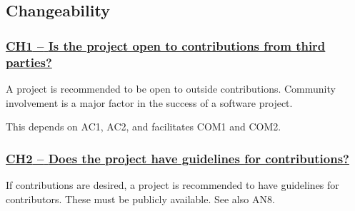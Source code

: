 \documentclass[a4paper,11pt]{article}
\newcommand{\indicator}[1]{\subsubsection*{\underline{#1}}}
\begin{document}
\subsection{Changeability}\label{sec:cha}
%
%
%

\newcommand{\chOneName}{CH1}
\newcommand{\chOneID}{\chOneName}
\newcommand{\chOneText}{Is the project open to contributions from third parties?}
\indicator{\chOneName{ }--{ }\chOneText}\label{id:ch1} 

A project is recommended to be open to outside contributions. Community
involvement is a major factor in the success of a software project. 

This depends on AC1, AC2, and facilitates COM1 and COM2. 

\newcommand{\chTwoName}{CH2}
\newcommand{\chTwoID}{\chTwoName}
\newcommand{\chTwoText}{Does the project have guidelines for contributions?}
\indicator{\chTwoName{ }--{ }\chTwoText}\label{id:ch2} 

If contributions are desired, a project is recommended to have guidelines for
contributors. These must be publicly available.
See also AN8.
\end{document}
